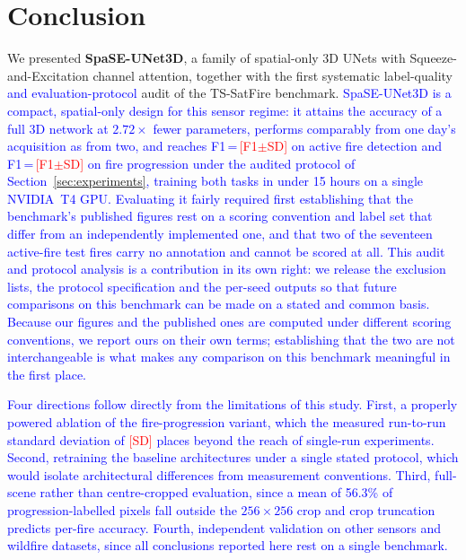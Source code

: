 \documentclass[sensors,article,submit,moreauthors,pdftex]{Definitions/mdpi}
\newcommand{\rev}[1]{\textcolor{blue}{#1}}
\newcommand{\afTStwo}{\textcolor{red}{[F1$\pm$SD]}}
\newcommand{\fpAll}{\textcolor{red}{[F1$\pm$SD]}}
\newcommand{\fpSD}{\textcolor{red}{[SD]}}
\begin{document}
\section{Conclusion}
\label{sec:conclusion}

We presented \textbf{SpaSE-UNet3D}, a family of spatial-only 3D UNets with Squeeze-and-Excitation channel attention, together with the first systematic label-quality \rev{and evaluation-protocol} audit of the TS-SatFire benchmark. \rev{SpaSE-UNet3D is a compact, spatial-only design for this sensor regime: it
attains the accuracy of a full 3D network at $2.72\times$ fewer parameters,
performs comparably from one day's acquisition as from two, and reaches
F1\,=\,\afTStwo{} on active fire detection and F1\,=\,\fpAll{} on fire
progression under the audited protocol of Section~\ref{sec:experiments},
training both tasks in under 15 hours on a single NVIDIA~T4 GPU. Evaluating it
fairly required first establishing that the benchmark's published figures rest
on a scoring convention and label set that differ from an independently
implemented one, and that two of the seventeen active-fire test fires carry no
annotation and cannot be scored at all. This audit and protocol analysis is a
contribution in its own right: we release the exclusion lists, the protocol
specification and the per-seed outputs so that future comparisons on this
benchmark can be made on a stated and common basis. Because our figures and the
published ones are computed under different scoring conventions, we report ours
on their own terms; establishing that the two are not interchangeable is what
makes any comparison on this benchmark meaningful in the first place.}

\rev{Four directions follow directly from the limitations of this study. First, a properly powered ablation of the fire-progression variant, which the measured run-to-run standard deviation of \fpSD{} places beyond the reach of single-run experiments. Second, retraining the baseline architectures under a single stated protocol, which would isolate architectural differences from measurement conventions. Third, full-scene rather than centre-cropped evaluation, since a mean of 56.3\% of progression-labelled pixels fall outside the $256 \times 256$ crop and crop truncation predicts per-fire accuracy. Fourth, independent validation on other sensors and wildfire datasets, since all conclusions reported here rest on a single benchmark.}
\end{document}
